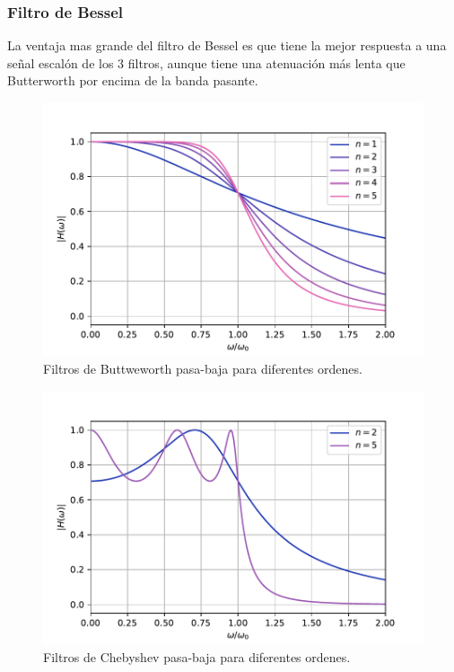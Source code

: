 \documentclass[11pt]{article} %
\begin{document}
\subsubsection{Filtro de Bessel}

La ventaja mas grande del filtro de Bessel es que tiene la mejor respuesta a una señal escalón de los 3 filtros, aunque tiene una atenuación más lenta que Butterworth por encima de la banda pasante. 


\begin{figure}[h!] \centering
\includegraphics[scale=0.75]{2.3-Butterworth.pdf}
\caption{Filtros de Buttweworth pasa-baja para diferentes ordenes.}
\label{Fig:2.06}
\end{figure}

\begin{figure}[h!] \centering
\includegraphics[scale=0.75]{2.3-Chebyshev.pdf}
\caption{Filtros de Chebyshev pasa-baja para diferentes ordenes.}
\label{Fig:2.07}
\end{figure}
\end{document}

